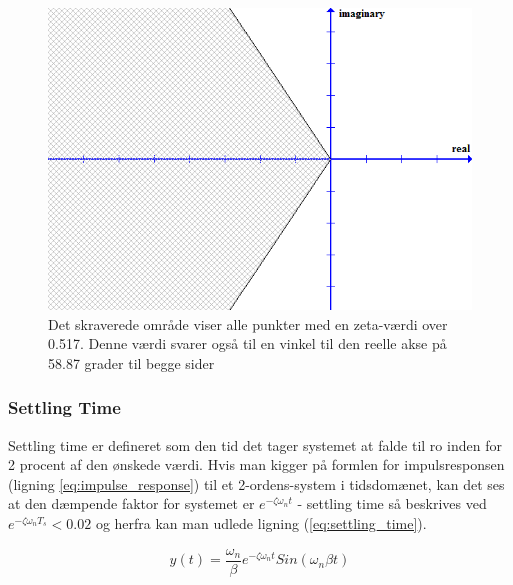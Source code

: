 \begin{figure}[ht]
	\begin{center}
		\includegraphics[scale=0.5]{Billeder/Overshoot.PNG}
	\end{center}
\caption{Det skraverede område viser alle punkter med en zeta-værdi over 0.517. Denne værdi svarer også til en vinkel til den reelle akse på 58.87 grader til begge sider}
\label{fig:Overshoot}
\end{figure}

\subsubsection{Settling Time}

Settling time er defineret som den tid det tager systemet at falde til ro inden for 2 procent af den ønskede værdi. Hvis man kigger på formlen for impulsresponsen (ligning \ref{eq:impulse_response})  til et 2-ordens-system i tidsdomænet, kan det ses at den dæmpende faktor for systemet er $e^{-\zeta\omega_{n}t}$ - settling time så beskrives ved $e^{-\zeta\omega_{n}T_{s}}<0.02$ og herfra kan man udlede ligning (\ref{eq:settling_time}).

\begin{equation}\label{eq:impulse_response}
y(t)=\frac{\omega_{n}}{\beta}e^{-\zeta\omega_{n}t}Sin(\omega_{n}\beta t)
\end{equation}

